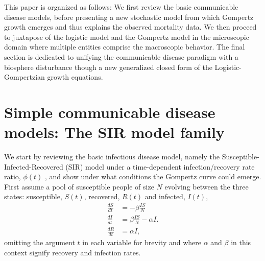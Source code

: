 \documentclass{article}
\begin{document}
This paper is organized as follows: We first review the basic communicable disease models, before presenting a new stochastic model from which Gompertz growth emerges and thus explains the observed mortality data. We then proceed to juxtapose of the logistic model and the Gompertz model in the microscopic domain where multiple entities comprise the macroscopic behavior. The final section is dedicated to unifying the communicable disease paradigm with a biosphere disturbance though a new generalized closed form of the Logistic-Gompertzian growth equations.

\section*{Simple communicable disease models: The SIR model family}
We start by reviewing the basic infectious disease model, namely the Susceptible-Infected-Recovered (SIR) model under a time-dependent infection/recovery rate ratio, $\phi(t)$ \cite{kermack1927contribution}, and show under what conditions the Gompertz curve could emerge. First assume a pool of susceptible people of size $N$ evolving between the three states: susceptible, $S(t)$, recovered, $R(t)$ and infected, $I(t)$,
\begin{align}
\label{eq:SIR}
\frac{dS}{dt}& = -\beta \frac{IS}{N}\nonumber\\
\frac{dI}{dt}& = \beta \frac{IS}{N} - \alpha I.\\
\frac{dR}{dt}& = \alpha I\nonumber,
\end{align}
omitting the argument $t$ in each variable for brevity and where $\alpha$ and $\beta$ in this context signify recovery and infection rates.
\end{document}

